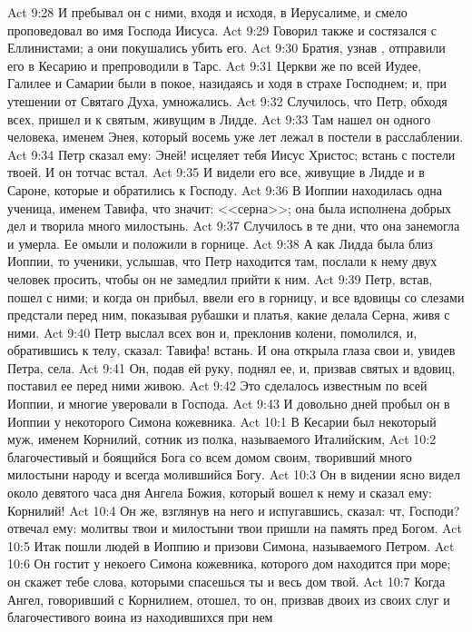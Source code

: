 \vs Act 9:28 И пребывал он с ними, входя и исходя, в Иерусалиме, и смело проповедовал во имя Господа Иисуса.
\vs Act 9:29 Говорил также и состязался с Еллинистами; а они покушались убить его.
\vs Act 9:30 Братия, узнав , отправили его в Кесарию и препроводили в Тарс.
\rsbpar\vs Act 9:31 Церкви же по всей Иудее, Галилее и Самарии были в покое, назидаясь и ходя в страхе Господнем; и, при утешении от Святаго Духа, умножались.
\rsbpar\vs Act 9:32 Случилось, что Петр, обходя всех, пришел и к святым, живущим в Лидде.
\vs Act 9:33 Там нашел он одного человека, именем Энея, который восемь уже лет лежал в постели в расслаблении.
\vs Act 9:34 Петр сказал ему: Эней! исцеляет тебя Иисус Христос; встань с постели твоей. И он тотчас встал.
\vs Act 9:35 И видели его все, живущие в Лидде и в Сароне, которые и обратились к Господу.
\rsbpar\vs Act 9:36 В Иоппии находилась одна ученица, именем Тавифа, что значит: <<серна>>; она была исполнена добрых дел и творила много милостынь.
\vs Act 9:37 Случилось в те дни, что она занемогла и умерла. Ее омыли и положили в горнице.
\vs Act 9:38 А как Лидда была близ Иоппии, то ученики, услышав, что Петр находится там, послали к нему двух человек просить, чтобы он не замедлил прийти к ним.
\vs Act 9:39 Петр, встав, пошел с ними; и когда он прибыл, ввели его в горницу, и все вдовицы со слезами предстали перед ним, показывая рубашки и платья, какие делала Серна, живя с ними.
\vs Act 9:40 Петр выслал всех вон и, преклонив колени, помолился, и, обратившись к телу, сказал: Тавифа! встань. И она открыла глаза свои и, увидев Петра, села.
\vs Act 9:41 Он, подав ей руку, поднял ее, и, призвав святых и вдовиц, поставил ее перед ними живою.
\vs Act 9:42 Это сделалось известным по всей Иоппии, и многие уверовали в Господа.
\vs Act 9:43 И довольно дней пробыл он в Иоппии у некоторого Симона кожевника.
\vs Act 10:1 В Кесарии был некоторый муж, именем Корнилий, сотник из полка, называемого Италийским,
\vs Act 10:2 благочестивый и боящийся Бога со всем домом своим, творивший много милостыни народу и всегда молившийся Богу.
\vs Act 10:3 Он в видении ясно видел около девятого часа дня Ангела Божия, который вошел к нему и сказал ему: Корнилий!
\vs Act 10:4 Он же, взглянув на него и испугавшись, сказал: чт, Господи?  отвечал ему: молитвы твои и милостыни твои пришли на память пред Богом.
\vs Act 10:5 Итак пошли людей в Иоппию и призови Симона, называемого Петром.
\vs Act 10:6 Он гостит у некоего Симона кожевника, которого дом находится при море; он скажет тебе слова, которыми спасешься ты и весь дом твой.
\vs Act 10:7 Когда Ангел, говоривший с Корнилием, отошел, то он, призвав двоих из своих слуг и благочестивого воина из находившихся при нем

